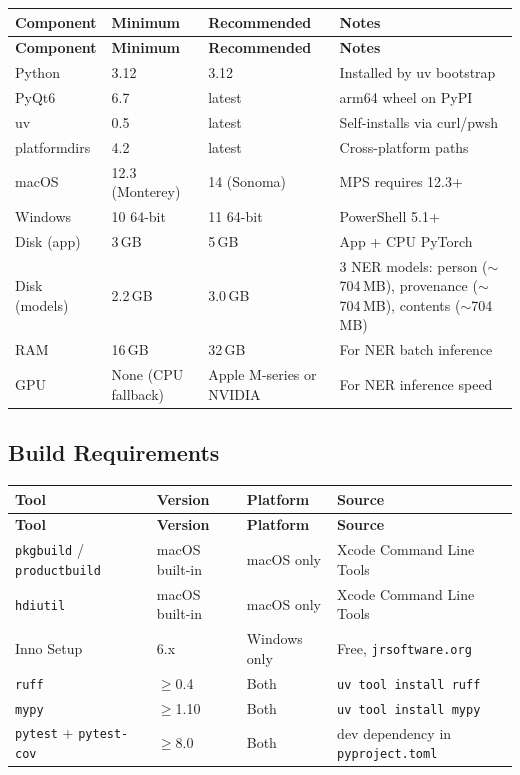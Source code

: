\documentclass[12pt]{article}
\newcommand{\code}[1]{\texttt{#1}}
\begin{document}
\begin{longtable}{|l|p{3cm}|p{3cm}|p{3cm}|}
\hline
\textbf{Component} & \textbf{Minimum} & \textbf{Recommended} & \textbf{Notes} \\
\hline
\endfirsthead
\hline
\textbf{Component} & \textbf{Minimum} & \textbf{Recommended} & \textbf{Notes} \\
\hline
\endhead
\hline
\endfoot
Python & 3.12 & 3.12 & Installed by uv bootstrap \\
\hline
PyQt6 & 6.7 & latest & arm64 wheel on PyPI \\
\hline
uv & 0.5 & latest & Self-installs via curl/pwsh \\
\hline
platformdirs & 4.2 & latest & Cross-platform paths \\
\hline
macOS & 12.3 (Monterey) & 14 (Sonoma) & MPS requires 12.3+ \\
\hline
Windows & 10 64-bit & 11 64-bit & PowerShell 5.1+ \\
\hline
Disk (app) & 3\,GB & 5\,GB & App + CPU PyTorch \\
\hline
Disk (models) & 2.2\,GB & 3.0\,GB & 3 NER models: person ($\sim$704\,MB), provenance ($\sim$704\,MB), contents ($\sim$704\,MB) \\
\hline
RAM & 16\,GB & 32\,GB & For NER batch inference \\
\hline
GPU & None (CPU fallback) & Apple M-series or NVIDIA & For NER inference speed \\
\hline
\end{longtable}

\subsection{Build Requirements}

\begin{longtable}{|l|l|l|l|}
\hline
\textbf{Tool} & \textbf{Version} & \textbf{Platform} & \textbf{Source} \\
\hline
\endfirsthead
\hline
\textbf{Tool} & \textbf{Version} & \textbf{Platform} & \textbf{Source} \\
\hline
\endhead
\hline
\endfoot
\code{pkgbuild} / \code{productbuild} & macOS built-in & macOS only & Xcode Command Line Tools \\
\hline
\code{hdiutil} & macOS built-in & macOS only & Xcode Command Line Tools \\
\hline
Inno Setup & 6.x & Windows only & Free, \code{jrsoftware.org} \\
\hline
\code{ruff} & $\geq$0.4 & Both & \code{uv tool install ruff} \\
\hline
\code{mypy} & $\geq$1.10 & Both & \code{uv tool install mypy} \\
\hline
\code{pytest} + \code{pytest-cov} & $\geq$8.0 & Both & dev dependency in \code{pyproject.toml} \\
\hline
\end{longtable}
\end{document}
